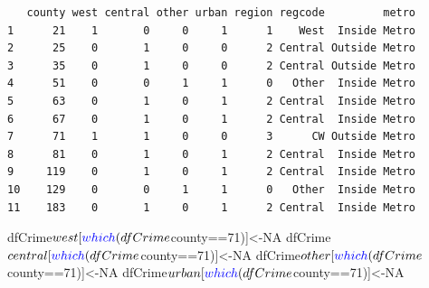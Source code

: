 \documentclass[]{article}
\newenvironment{Shaded}{}{}
\newcommand{\CommentTok}[1]{\textcolor[rgb]{0.00,0.50,0.00}{#1}}
\newcommand{\DecValTok}[1]{#1}
\newcommand{\FloatTok}[1]{#1}
\newcommand{\KeywordTok}[1]{\textcolor[rgb]{0.00,0.00,1.00}{#1}}
\newcommand{\NormalTok}[1]{#1}
\newcommand{\OperatorTok}[1]{#1}
\newcommand{\OtherTok}[1]{\textcolor[rgb]{1.00,0.25,0.00}{#1}}
\newcommand{\StringTok}[1]{\textcolor[rgb]{0.00,0.50,0.50}{#1}}
\begin{document}
\begin{Shaded}
\end{Shaded}

\begin{verbatim}
   county west central other urban region regcode         metro
1      21    1       0     0     1      1    West  Inside Metro
2      25    0       1     0     0      2 Central Outside Metro
3      35    0       1     0     0      2 Central Outside Metro
4      51    0       0     1     1      0   Other  Inside Metro
5      63    0       1     0     1      2 Central  Inside Metro
6      67    0       1     0     1      2 Central  Inside Metro
7      71    1       1     0     0      3      CW Outside Metro
8      81    0       1     0     1      2 Central  Inside Metro
9     119    0       1     0     1      2 Central  Inside Metro
10    129    0       0     1     1      0   Other  Inside Metro
11    183    0       1     0     1      2 Central  Inside Metro
\end{verbatim}

\begin{Shaded}
\begin{Highlighting}[]
\NormalTok{dfCrime}\OperatorTok{$}\NormalTok{west[}\KeywordTok{which}\NormalTok{(dfCrime}\OperatorTok{$}\NormalTok{county}\OperatorTok{==}\DecValTok{71}\NormalTok{)]<-}\OtherTok{NA}
\NormalTok{dfCrime}\OperatorTok{$}\NormalTok{central[}\KeywordTok{which}\NormalTok{(dfCrime}\OperatorTok{$}\NormalTok{county}\OperatorTok{==}\DecValTok{71}\NormalTok{)]<-}\OtherTok{NA}
\NormalTok{dfCrime}\OperatorTok{$}\NormalTok{other[}\KeywordTok{which}\NormalTok{(dfCrime}\OperatorTok{$}\NormalTok{county}\OperatorTok{==}\DecValTok{71}\NormalTok{)]<-}\OtherTok{NA}
\NormalTok{dfCrime}\OperatorTok{$}\NormalTok{urban[}\KeywordTok{which}\NormalTok{(dfCrime}\OperatorTok{$}\NormalTok{county}\OperatorTok{==}\DecValTok{71}\NormalTok{)]<-}\OtherTok{NA}
\end{Highlighting}
\end{Shaded}
\end{document}
